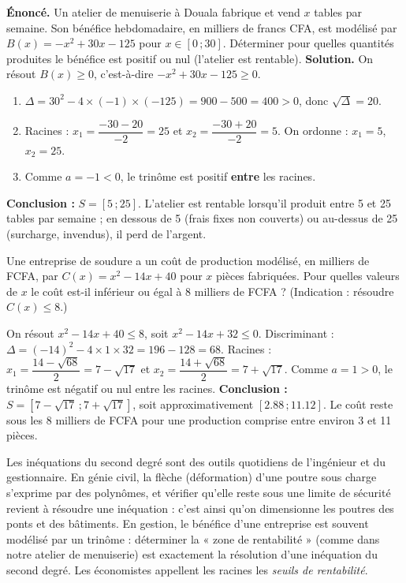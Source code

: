 \documentclass[11pt]{article}
\newcounter{popsec}
\newcounter{popsub}
\newcommand{\courssub}[1]{%
  \stepcounter{popsub}%
  \par\vspace{9pt}\noindent{\popxbold\fontsize{11.5}{13}\selectfont\color{popink}{\color{poporange}\thepopsec.\thepopsub}\hspace{6pt}#1}\par\nopagebreak\vspace{4pt}
}
\begin{document}
\courssub{Application : rentabilité d'un atelier}

\begin{exoresolu}
\textbf{Énoncé.} Un atelier de menuiserie à Douala fabrique et vend $x$ tables par semaine. Son bénéfice hebdomadaire, en milliers de francs CFA, est modélisé par $B(x)=-x^2+30x-125$ pour $x\in[0\,;30]$. Déterminer pour quelles quantités produites le bénéfice est positif ou nul (l'atelier est rentable).
\tcblower
\textbf{Solution.} On résout $B(x)\geq 0$, c'est-à-dire $-x^2+30x-125\geq 0$.
\begin{enumerate}
\item $\Delta=30^2-4\times(-1)\times(-125)=900-500=400>0$, donc $\sqrt{\Delta}=20$.
\item Racines : $x_1=\dfrac{-30-20}{-2}=25$ et $x_2=\dfrac{-30+20}{-2}=5$. On ordonne : $x_1=5$, $x_2=25$.
\item Comme $a=-1<0$, le trinôme est positif \textbf{entre} les racines.
\end{enumerate}
\textbf{Conclusion :} $S=[5\,;25]$. L'atelier est rentable lorsqu'il produit entre 5 et 25 tables par semaine ; en dessous de 5 (frais fixes non couverts) ou au-dessus de 25 (surcharge, invendus), il perd de l'argent.
\end{exoresolu}

\begin{exercice}
Une entreprise de soudure a un coût de production modélisé, en milliers de FCFA, par $C(x)=x^2-14x+40$ pour $x$ pièces fabriquées. Pour quelles valeurs de $x$ le coût est-il inférieur ou égal à \num{8} milliers de FCFA ? (Indication : résoudre $C(x)\leq 8$.)
\end{exercice}

\begin{corrige}[Exercice 1]
On résout $x^2-14x+40\leq 8$, soit $x^2-14x+32\leq 0$.
Discriminant : $\Delta=(-14)^2-4\times 1\times 32=196-128=68$.
Racines : $x_1=\dfrac{14-\sqrt{68}}{2}=7-\sqrt{17}$ et $x_2=\dfrac{14+\sqrt{68}}{2}=7+\sqrt{17}$.
Comme $a=1>0$, le trinôme est négatif ou nul entre les racines.
\textbf{Conclusion :} $S=[7-\sqrt{17}\,;7+\sqrt{17}]$, soit approximativement $[\num{2,88}\,;\num{11,12}]$. Le coût reste sous les \num{8} milliers de FCFA pour une production comprise entre environ 3 et 11 pièces.
\end{corrige}

\begin{savaistu}
Les inéquations du second degré sont des outils quotidiens de l'ingénieur et du gestionnaire. En génie civil, la flèche (déformation) d'une poutre sous charge s'exprime par des polynômes, et vérifier qu'elle reste sous une limite de sécurité revient à résoudre une inéquation : c'est ainsi qu'on dimensionne les poutres des ponts et des bâtiments. En gestion, le bénéfice d'une entreprise est souvent modélisé par un trinôme : déterminer la « zone de rentabilité » (comme dans notre atelier de menuiserie) est exactement la résolution d'une inéquation du second degré. Les économistes appellent les racines les \emph{seuils de rentabilité}.
\end{savaistu}
\end{document}
